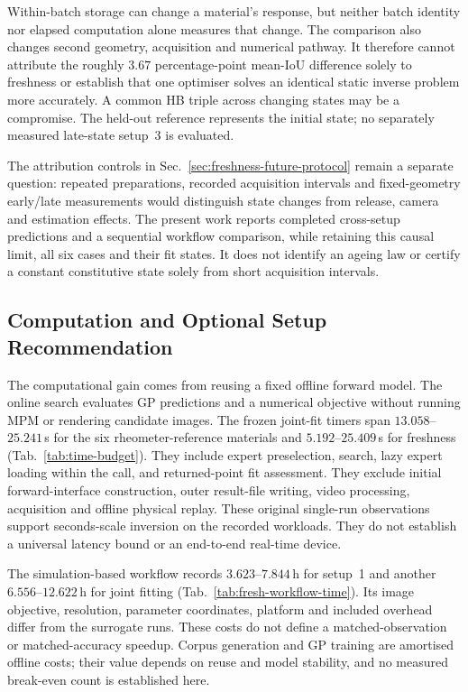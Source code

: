 Within-batch storage can change a material's response, but neither batch identity nor elapsed computation alone measures that change. The comparison also changes second geometry, acquisition and numerical pathway. It therefore cannot attribute the roughly $3.67$ percentage-point mean-IoU difference solely to freshness or establish that one optimiser solves an identical static inverse problem more accurately. A common HB triple across changing states may be a compromise. The held-out reference represents the initial state; no separately measured late-state setup~3 is evaluated.

The attribution controls in
Sec.~\ref{sec:freshness-future-protocol} remain a separate question:
repeated preparations, recorded acquisition intervals and fixed-geometry
early/late measurements would distinguish state changes from release,
camera and estimation effects. The present work reports completed
cross-setup predictions and a sequential workflow comparison,
while retaining this causal limit, all six cases and their fit states.
It does not identify an ageing law or certify a constant constitutive
state solely from short acquisition intervals.

\subsection{Computation and Optional Setup Recommendation}

The computational gain comes from reusing a fixed offline forward
model. The online search evaluates GP predictions and a numerical
objective without running MPM or rendering candidate images.
The frozen joint-fit timers span $13.058$--$25.241$\,s for the six
rheometer-reference materials and $5.192$--$25.409$\,s for freshness
(Tab.~\ref{tab:time-budget}). They include expert preselection,
search, lazy expert loading within the call, and returned-point fit
assessment. They exclude initial forward-interface construction,
outer result-file writing, video processing, acquisition and offline
physical replay. These original single-run observations support
seconds-scale inversion on the recorded workloads. They do not
establish a universal latency bound or an end-to-end real-time device.

The simulation-based workflow records $3.623$--$7.844$\,h for
setup~1 and another $6.556$--$12.622$\,h for joint fitting
(Tab.~\ref{tab:fresh-workflow-time}). Its image objective, resolution,
parameter coordinates, platform and included overhead differ from the
surrogate runs. These costs do not define a matched-observation or
matched-accuracy speedup. Corpus generation and GP training are
amortised offline costs; their value depends on reuse and model
stability, and no measured break-even count is established here.



